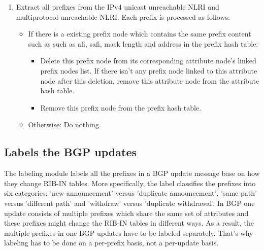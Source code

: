 \begin{enumerate}
	\item{Extract all prefixes from the IPv4 unicast unreachable NLRI and multiprotocol unreachable NLRI. Each prefix is processed as follows:}
	\begin{itemize}
		\item{If there is a existing prefix node which contains the same prefix content such as such as afi, safi, mask length and address in the prefix hash table:}
		\begin{itemize}
			\item{Delete this prefix node from its corresponding attribute node's linked prefix nodes list. If there isn't any prefix node linked to this attribute node after this deletion, remove this attribute node from the attribute hash table.}
			\item{Remove this prefix node from the prefix hash table.} 		\end{itemize} 					
		\item{Otherwise: Do nothing.}
	\end{itemize}		
\end{enumerate}


\subsection{Labels the BGP updates}
\label{sec:labeling:label}
The labeling module labels all the prefixes in a BGP update message base on how they change RIB-IN tables. More specifically, the label classifies the prefixes into six categories: 'new announcement' versus 'duplicate announcement', 'same path' versus 'different path' and 'withdraw' versus 'duplicate withdrawal'. In BGP one update consists of multiple prefixes which share the same set of attributes and these prefixes might change the RIB-IN tables in different ways. As a result, the multiple prefixes in one BGP updates have to be labeled separately. That's why labeling has to be done on a per-prefix basis, not a per-update basis.

